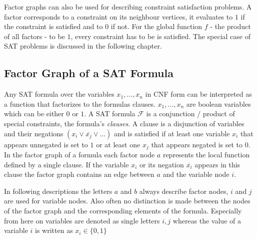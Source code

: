 \newpage
Factor graphs can also be used for describing constraint satisfaction problems. A factor corresponds to a constraint on its neighbour vertices, it evaluates to $1$ if the constraint is satisfied and to $0$ if not. For the global function $f$ - the product of all factors - to be $1$, every constraint has to be is satisfied. The special case of SAT problems is discussed in the following chapter.



\subsection{Factor Graph of a SAT Formula}
Any SAT formula over the variables $x_1, \ldots, x_n$ in CNF form can be interpreted as a function that factorizes to the formulas clauses. \newline
$x_1, \ldots, x_n$ are boolean variables which can be either $0$ or $1$. A SAT formula $\mathcal{F}$ is a conjunction / product of special constraints, the formula's \emph{clauses}. A clause is a disjunction of variables and their negations  $(x_i\lor \overline{x_j} \lor \ldots)$ and is satisfied if at least one variable $x_i$ that appears unnegated is set to $1$ or at least one $x_j$ that appears negated is set to $0$. \newline
In the factor graph of a formula each factor node $a$ represents the local function defined by a single clause. If the variable $x_i$ or its negation $\overline{x_i}$ appears in this clause the factor graph contains an edge between $a$ and the variable node $i$. 

In following descriptions the letters $a$ and $b$ always describe factor nodes, $i$ and $j$ are used for variable nodes. Also often no distinction is made between the nodes of the factor graph and the corresponding elements of the formula. Especially from here on variables are denoted as single letters $i, j$ whereas the value of a variable $i$ is written as $x_i \in \{0, 1\}$

